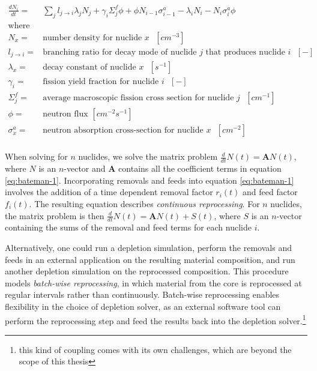 \begin{align}
    \label{eq:bateman-1}
    \frac{dN_{i}}{dt} =& \sum_{j} l_{j\to i}\lambda_{j} N_{j} + \gamma_{i} \Sigma^{f}_{j}\phi + \phi N_{i-1} \sigma^{a}_{i-1} - \lambda_{i}N_{i} - N_{i}\sigma^{a}_{i}\phi\\
    \text{where} & \nonumber \\
    N_{x} =& \text{number density for nuclide $x$ $[cm^{-3}]$}\nonumber\\
    l_{j\to i} =& \text{branching ratio for decay mode of nuclide $j$ that produces nuclide $i$ $[-]$}\nonumber\\
    \lambda_{x} =& \text{decay constant of nuclide $x$ $[s^{-1}]$}\nonumber\\
    \gamma_{i} =& \text{fission yield fraction for nuclide $i$ $[-]$}\nonumber \\
    \Sigma^{f}_{j} =& \text{average macroscopic fission cross section for nuclide $j$ $[cm^{-1}]$}\nonumber\\
    \phi =& \text{neutron flux $[cm^{-2}s^{-1}]$}\nonumber\\
    \sigma^{a}_{x} =& \text{neutron absorption cross-section for nuclide $x$ $[cm^{-2}]$}\nonumber\\
\end{align}
    
When solving for $n$ nuclides, we solve the matrix problem
$\frac{d}{dt}N(t) = \mathbf{A}N(t)$, where $N$ is an $n$-vector and
$\mathbf{A}$ contains all the coefficient terms in equation \ref{eq:bateman-1}.
Incorporating removals and feeds into equation \ref{eq:bateman-1} involves the
addition of a time dependent removal factor $r_{i}(t)$ and feed factor
$f_{i}(t)$. The resulting equation describes {\it continuous reprocessing}.
For $n$ nuclides, the matrix problem is then
$\frac{d}{dt}N(t) = \mathbf{A}N(t) + S(t)$, where $S$ is an $n$-vector
containing the sums of the removal and feed terms for each nuclide $i$.%

Alternatively, one could run a depletion simulation, perform the removals and
feeds in an external application on the resulting material composition, and run
another depletion simulation on the reprocessed composition. This procedure
models {\it batch-wise reprocessing}, in which material from the core is
reprocessed at regular intervals rather than continuously. Batch-wise
reprocessing enables flexibility in the choice of depletion solver, as an
external software tool can perform the reprocessing step and feed the results
back into the depletion solver.\footnote{this kind of coupling comes with its
own challenges, which are beyond the scope of this thesis}

